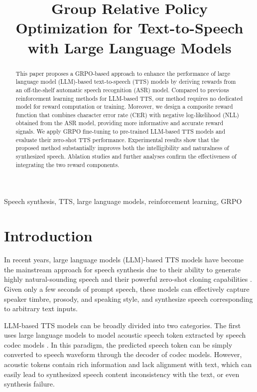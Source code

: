 \documentclass{article}
\title{Group Relative Policy Optimization for Text-to-Speech with Large Language Models}
\begin{document}
\ninept
%
\maketitle
%
\begin{abstract}
This paper proposes a GRPO-based approach to enhance the performance of large language model (LLM)-based text-to-speech (TTS) models by deriving rewards from an off-the-shelf automatic speech recognition (ASR) model. Compared to previous reinforcement learning methods for LLM-based TTS, our method requires no dedicated model for reward computation or training. Moreover, we design a composite reward function that combines character error rate (CER) with negative log-likelihood (NLL) obtained from the ASR model, providing more informative and accurate reward signals. We apply GRPO fine-tuning to pre-trained LLM-based TTS models and evaluate their zero-shot TTS performance. Experimental results show that the proposed method substantially improves both the intelligibility and naturalness of synthesized speech. Ablation studies and further analyses confirm the effectiveness of integrating the two reward components.
\end{abstract}
%
\begin{keywords}
Speech synthesis, TTS, large language models, reinforcement learning, GRPO
\end{keywords}
%
\vspace{-0.2cm}
\section{Introduction}
\label{sec:intro}
\vspace{-0.2cm}

In recent years, large language models (LLM)-based TTS models have become the mainstream approach for speech synthesis due to their ability to generate highly natural-sounding speech and their powerful zero-shot cloning capabilities \cite{valle,lauragpt,cosyvoice,cosyvoice2,cosyvoice3,llasa,sparktts}. 
Given only a few seconds of prompt speech, these models can effectively capture speaker timbre, prosody, and speaking style, and synthesize speech corresponding to arbitrary text inputs. 

LLM-based TTS models can be broadly divided into two categories. 
The first uses large language models to model acoustic speech token extracted by speech codec models \cite{valle,lauragpt}. In this paradigm, the predicted speech token can be simply converted to speech waveform through the decoder of codec models. However, acoustic tokens contain rich information and lack alignment with text, which can easily lead to synthesized speech content inconsistency with the text, or even synthesis failure.
\end{document}
